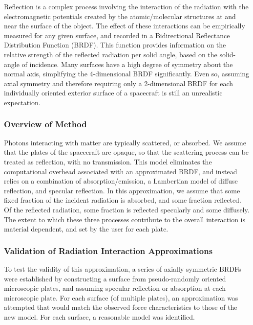         Reflection is a complex process involving the interaction of the
        radiation with the electromagnetic potentials created by the
        atomic/molecular structures at and near the surface of the object.
        The effect of these interactions can be empirically measured for
        any given surface, and recorded in a Bidirectional
        Reflectance Distribution Function (BRDF). This
        function provides information on the relative strength of the reflected
        radiation per solid angle, based on the solid{}-angle of incidence.
        Many surfaces have a high degree of symmetry about the normal axis,
        simplifying the 4{}-dimensional BRDF significantly. Even so, assuming
        axial symmetry and therefore requiring only a 2{}-dimensional BRDF for
        each individually oriented exterior surface of a spacecraft is still
        an unrealistic expectation.


      \subsubsection{Overview of Method}
      Photons interacting with matter are typically scattered, or
        absorbed.  We assume that the plates of the spacecraft are
        opaque, so that the scattering process can be treated as
        reflection, with no transmission.
        This model eliminates the computational overhead associated with an
        approximated BRDF, and instead relies on a combination of
        absorption/emission, a Lambertian model of diffuse reflection, and
        specular reflection.  In this approximation, we assume that some
        fixed fraction of the incident radiation is absorbed, and some fraction
        reflected.  Of the reflected radiation, some fraction is
        reflected specularly and some diffusely.  The extent to which
        these three processes contribute to the overall interaction is
        material dependent, and set by the user for each plate.

    \subsubsection{Validation of Radiation Interaction
    Approximations}\label{sec:mathform_pflux_resp_valid}

      To test the validity of this approximation, a series of axially
      symmetric BRDFs were established by constructing a surface from
      pseudo{}-randomly oriented microscopic plates, and assuming specular
      reflection or absorption at each microscopic plate. For each surface (of
      multiple plates), an approximation was attempted that would match the
      observed force characteristics to those of the new model.  For each
      surface, a reasonable model was identified.

